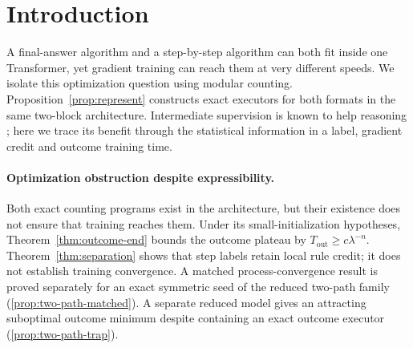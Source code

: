 \begin{abstract}
A two-block Transformer can express both direct and step-by-step modular counting,
yet their supervision formats expose different gradient signals.
Under small initialization with a fixed ReLU pattern, outcome-supervised
cross-entropy flow has an exponentially long plateau at near-chance correct-answer probabilities.
The mechanism is a contraction coefficient $\lambda$: unseen letters hide outcome
credit on the scale $\lambda^n$, whereas displayed states expose a local innovation
controlled by $1-\lambda^2$. A Transformer score expansion connects this data
structure to gradient credit and the outcome plateau. A reduced two-path model
contains both exact executors but also an attracting suboptimal outcome minimum
inside an affine activation regime. An exact symmetric seed additionally gives polynomial process learning and
permanent outcome failure, while its averaging path stays invariant. Convergence
from the tested perturbed seeds remains open. Experiments distinguish prior fitting
from rule learning and test routing and pretrained-model transfer. An object-tracking
reversal identifies a limit of the mechanism. Unrestricted feature and routing
discovery remains open.
\end{abstract}

\section{Introduction}
\label{sec:intro}

A final-answer algorithm and a step-by-step algorithm can both fit inside one Transformer,
yet gradient training can reach them at very different speeds. We isolate this optimization
question using modular counting. Proposition~\ref{prop:represent} constructs exact executors
for both formats in the same two-block architecture. Intermediate supervision is known to
help reasoning \citep{nye2021scratchpads,wei2022cot,lightman2023verify}; here we trace its
benefit through the statistical information in a label, gradient credit and outcome training time.

\paragraph{Optimization obstruction despite expressibility.}
Both exact counting programs exist in the architecture, but their existence does
not ensure that training reaches them. Under its small-initialization hypotheses,
Theorem~\ref{thm:outcome-end} bounds the outcome plateau by
$T_{\mathrm{out}}\ge c\lambda^{-n}$. Theorem~\ref{thm:separation} shows that
step labels retain local rule credit; it does not establish training convergence.
A matched process-convergence result is proved separately for an exact symmetric
seed of the reduced two-path family (\cref{prop:two-path-matched}).
A separate reduced model gives an attracting suboptimal outcome minimum despite
containing an exact outcome executor (\cref{prop:two-path-trap}).

